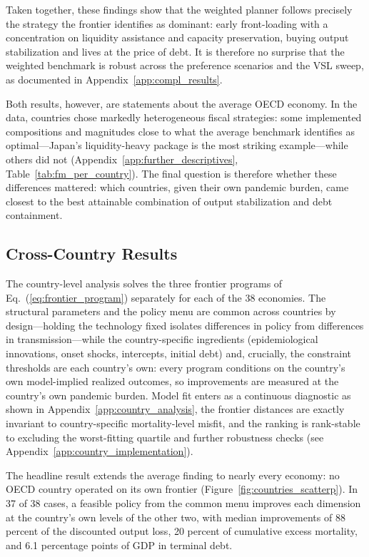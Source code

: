 \documentclass[12pt, a4paper]{article}
\begin{document}
Taken together, these findings show that the weighted planner follows precisely
the strategy the frontier identifies as dominant: early front-loading with a
concentration on liquidity assistance and capacity preservation, buying output
stabilization and lives at the price of debt. It is therefore no surprise that
the weighted benchmark is robust across the preference scenarios and the VSL
sweep, as documented in Appendix~\ref{app:compl_results}.

Both results, however, are statements about the average OECD economy. In the
data, countries chose markedly heterogeneous fiscal strategies: some
implemented compositions and magnitudes close to what the average benchmark
identifies as optimal---Japan's liquidity-heavy package is the most striking
example---while others did not (Appendix~\ref{app:further_descriptives},
Table~\ref{tab:fm_per_country}). The final question is therefore whether these differences mattered: which countries, given their own pandemic burden, came closest to the best
attainable combination of output stabilization and debt containment.


\subsection{Cross-Country Results}
\label{subsec:results_countries}

The country-level analysis solves the three frontier programs of Eq.~(\ref{eq:frontier_program}) separately for each of the 38 economies. The structural parameters and the policy menu are common across countries by design---holding the technology fixed isolates differences in policy from differences in transmission---while the country-specific ingredients (epidemiological innovations, onset shocks, intercepts, initial debt) and, crucially, the constraint thresholds are each country's own: every program conditions on the country's own model-implied realized outcomes, so improvements are measured at the country's own pandemic burden. Model fit enters as a continuous diagnostic as shown in Appendix~\ref{app:country_analysis}, the frontier distances are exactly invariant to country-specific mortality-level misfit, and the ranking is rank-stable to excluding the worst-fitting quartile and further robustness checks (see Appendix~\ref{app:country_implementation}).

The headline result extends the average finding to nearly every economy: no OECD country operated on its own frontier (Figure~\ref{fig:countries_scatterp}). In 37 of 38 cases, a feasible policy
from the common menu improves each dimension at the country's own levels of the other two, with median improvements of 88 percent of the discounted output loss, 20 percent of cumulative excess mortality, and 6.1 percentage points of GDP in terminal debt. 
\end{document}
